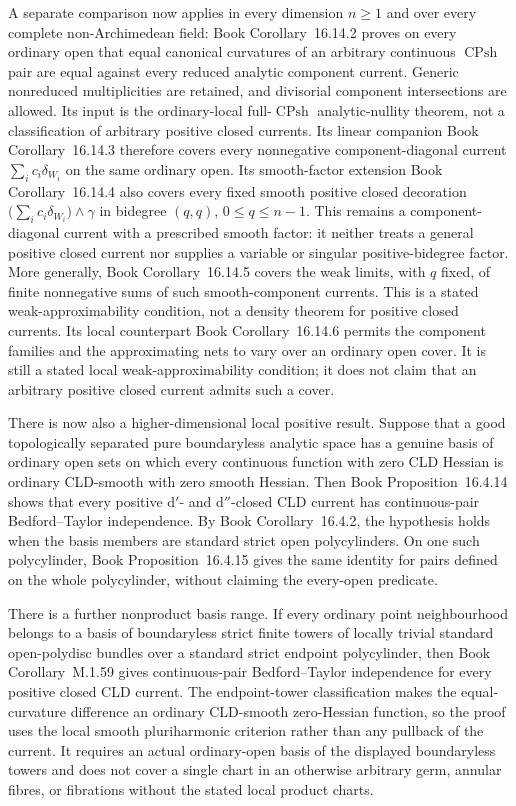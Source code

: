 \documentclass[11pt,a4paper]{article}
\theoremstyle{definition}
\theoremstyle{remark}
\begin{document}
A separate comparison now applies in every dimension \(n\geq1\) and over
every complete non-Archimedean field:
Book Corollary~16.14.2 proves on every ordinary open
that equal canonical curvatures of an arbitrary continuous
\(\operatorname{CPsh}\) pair are equal against every reduced analytic
component current.  Generic nonreduced multiplicities are retained, and
divisorial component intersections are allowed.  Its input is the
ordinary-local full-\(\operatorname{CPsh}\) analytic-nullity theorem, not a
classification of arbitrary positive closed currents.  Its linear companion
Book Corollary~16.14.3 therefore covers every
nonnegative component-diagonal current
\(\sum_i c_i\delta_{W_i}\) on the same ordinary open.  Its smooth-factor
extension Book Corollary~16.14.4 also covers every
fixed smooth positive closed decoration
\(\bigl(\sum_i c_i\delta_{W_i}\bigr)\wedge\gamma\) in bidegree
\((q,q)\), \(0\leq q\leq n-1\).  This remains a component-diagonal
current with a prescribed smooth factor: it neither treats a general
positive closed current nor supplies a variable or singular
positive-bidegree factor.  More generally,
Book Corollary~16.14.5 covers the weak limits, with
\(q\) fixed, of finite nonnegative sums of such smooth-component currents.
This is a stated weak-approximability condition, not a density theorem for
positive closed currents.  Its local counterpart
Book Corollary~16.14.6 permits the component
families and the approximating nets to vary over an ordinary open cover.  It
is still a stated local weak-approximability condition; it does not claim
that an arbitrary positive closed current admits such a cover.



There is now also a higher-dimensional local positive result.  Suppose that
a good topologically separated pure boundaryless analytic space has a
genuine basis of ordinary open sets on which every continuous function with
zero CLD Hessian is ordinary CLD-smooth with zero smooth Hessian.  Then
Book Proposition~16.4.14 shows that every positive
\(\mathrm d'\)- and \(\mathrm d''\)-closed CLD current has
continuous-pair Bedford--Taylor independence.  By
Book Corollary~16.4.2, the hypothesis holds when
the basis members are standard strict open polycylinders.  On one such
polycylinder, Book Proposition~16.4.15 gives the
same identity for pairs defined on the whole polycylinder, without claiming
the every-open predicate.

There is a further nonproduct basis range.  If every ordinary point
neighbourhood belongs to a basis of boundaryless strict finite towers of
locally trivial standard open-polydisc bundles over a standard strict
endpoint polycylinder, then
Book Corollary~M.1.59 gives continuous-pair
Bedford--Taylor independence for every positive closed CLD current.  The
endpoint-tower classification makes the equal-curvature difference an
ordinary CLD-smooth zero-Hessian function, so the proof uses the local smooth
pluriharmonic criterion rather than any pullback of the current.  It requires
an actual ordinary-open basis of the displayed boundaryless towers and does
not cover a single chart in an otherwise arbitrary germ, annular fibres, or
fibrations without the stated local product charts.
\end{document}
